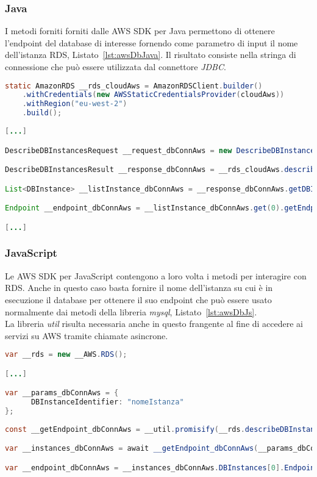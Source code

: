 \subsubsection{Java}
I metodi forniti forniti dalle AWS SDK per Java \cite{AwsJavaSDK} permettono di ottenere l'endpoint del database di interesse fornendo come parametro di input il nome dell'istanza RDS, Listato~\ref{lst:awsDbJava}. Il risultato consiste nella stringa di connessione che può essere utilizzata dal connettore \textit{JDBC}.\\

\begin{lstlisting}[language=Java,caption={Codice Java generato per la variabile di tipo sql su ambiente AWS per ottenere l'endpoint del database.}, label={lst:awsDbJava}]
static AmazonRDS __rds_cloudAws = AmazonRDSClient.builder()
	.withCredentials(new AWSStaticCredentialsProvider(cloudAws))
	.withRegion("eu-west-2")
	.build();
	
[...]

DescribeDBInstancesRequest __request_dbConnAws = new DescribeDBInstancesRequest().withDBInstanceIdentifier("nomeIstanza");

DescribeDBInstancesResult __response_dbConnAws = __rds_cloudAws.describeDBInstances(__request_dbConnAws);

List<DBInstance> __listInstance_dbConnAws = __response_dbConnAws.getDBInstances();

Endpoint __endpoint_dbConnAws = __listInstance_dbConnAws.get(0).getEndpoint();

[...]

\end{lstlisting}

\subsubsection{JavaScript}
Le AWS SDK per JavaScript \cite{AwsJsSDK} contengono a loro volta i metodi per interagire con RDS. Anche in questo caso basta fornire il nome dell'istanza su cui è in esecuzione il database per ottenere il suo endpoint che può essere usato normalmente dai metodi della libreria \textit{mysql}, Listato~\ref{lst:awsDbJs}.\\
La libreria \textit{util} risulta necessaria anche in questo frangente al fine di accedere ai servizi su AWS tramite chiamate asincrone. \\

\begin{lstlisting}[language=Java,caption={Codice JavaScript generato per la variabile di tipo sql su ambiente AWS per ottenere l'endpoint del database.}, label={lst:awsDbJs}]
var __rds = new __AWS.RDS();

[...]

var __params_dbConnAws = {
	  DBInstanceIdentifier: "nomeIstanza"
};
	
const __getEndpoint_dbConnAws = __util.promisify(__rds.describeDBInstances).bind(__rds);

var __instances_dbConnAws = await __getEndpoint_dbConnAws(__params_dbConnAws);

var __endpoint_dbConnAws = __instances_dbConnAws.DBInstances[0].Endpoint.Address;
\end{lstlisting}

